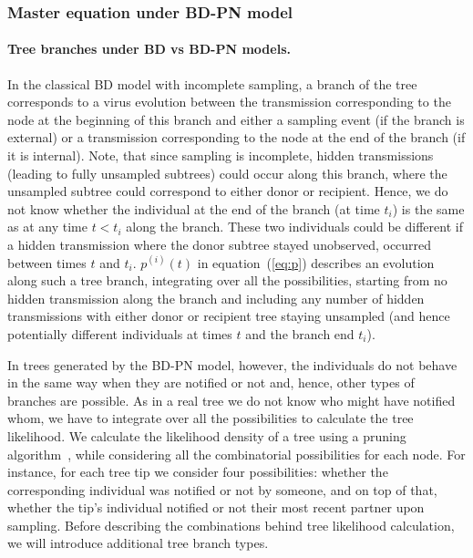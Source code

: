 \documentclass[10pt,letterpaper]{article}
\begin{document}
\subsubsection*{Master equation under BD-PN model}

\paragraph{Tree branches under BD vs BD-PN models.}

In the classical BD model with incomplete sampling, a branch of the tree corresponds to a virus evolution between the transmission corresponding to the node at the beginning of this branch and either a sampling event (if the branch is external) or a transmission corresponding to the node at the end of the branch (if it is internal). Note, that since sampling is incomplete, hidden transmissions (leading to fully unsampled subtrees) could occur along this branch, where the unsampled subtree could correspond to either donor or recipient.  Hence, we do not know whether the individual at the end of the branch (at time $t_i$) is the same as at any time $t < t_i$ along the branch. These two individuals could be different if a hidden transmission where the donor subtree stayed unobserved, occurred between times $t$ and $t_i$. $p^{(i)}(t)$ in equation~(\ref{eq:p}) describes an evolution along such a tree branch, integrating over all the possibilities, starting from no hidden transmission along the branch and including any number of hidden transmissions with either donor or recipient tree staying unsampled (and hence potentially different individuals at times $t$ and the branch end $t_i$).

In trees generated by the BD-PN model, however, the individuals do not behave in the same way when they are notified or not and, hence, other types of branches are possible. As in a real tree we do not know who might have notified whom, we have to integrate over all the possibilities to calculate the tree likelihood. We calculate the likelihood density of a tree using a pruning algorithm~\cite{10.1093/sysbio/22.3.240}, while considering all the combinatorial possibilities for each node. For instance, for each tree tip we consider four possibilities: whether the corresponding individual was notified or not by someone, and on top of that, whether the tip's individual notified or not their most recent partner upon sampling. Before describing the combinations behind tree likelihood calculation, we will introduce additional tree branch types.
\end{document}
